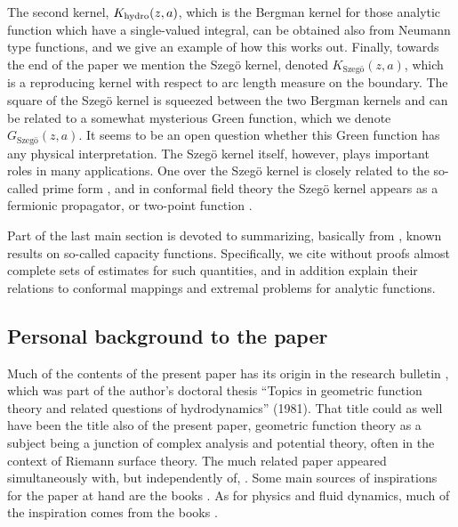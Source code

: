 \documentclass[reqno,12pt]{article}
\theoremstyle{plain}
\theoremstyle{definition}
\numberwithin{equation}{section}
\numberwithin{figure}{section}
\begin{document}
The second kernel, $K_{\rm hydro}(z,a)$, which is the Bergman kernel for those analytic function which have a single-valued
integral, can be obtained also from Neumann type functions, and we give an example of how this works out. Finally, 
towards the end of the paper we mention the Szeg\"o kernel, denoted $K_\text{Szeg\"o}(z,a)$, which is a reproducing kernel with respect to arc length 
measure on the boundary. The square of the Szeg\"o kernel is squeezed between the two Bergman kernels and can be
related to a somewhat mysterious Green function, which we denote $G_\text{Szeg\"o}(z,a)$. 
It  seems to be an open question whether this Green function has any physical interpretation.
The Szeg\"o kernel itself, however, plays important roles in many applications. One over the Szeg\"o kernel is closely
related to the so-called prime form \cite{Hejhal-1972, Fay-1973, Crowdy-2010}, and in conformal field theory the Szeg\"o kernel
appears as a fermionic propagator, or two-point function \cite{Raina-1989, Hoker-2024}. 
 
Part of the last main section is devoted to summarizing, basically  from \cite{Sario-Oikawa-1969},
known results on so-called capacity functions. Specifically, we cite without proofs almost complete sets
of  estimates for such quantities, and in addition explain their relations to conformal mappings and extremal problems for analytic functions.


\subsection{Personal background to the paper}

Much of the contents of the present paper has its origin in the research bulletin \cite{Gustafsson-1979}, which was part of the author's
doctoral thesis ``Topics in geometric function theory and related questions of hydrodynamics'' (1981). That title
could as well have been the title also of the present paper, 
geometric function theory as a subject being a junction of complex analysis and potential theory, often in the context of Riemann 
surface theory. The much related paper \cite{Richardson-1980} appeared simultaneously with, but independently of, \cite{Gustafsson-1979}.
Some main sources of inspirations for the paper at hand are the books
\cite{Schiffer-Spencer-1954, Sario-Oikawa-1969, Ahlfors-1973, Cohn-1980}. 
As for physics and fluid dynamics, much of the inspiration comes from the books \cite{Arnold-1978, Arnold-Khesin-1998}.
\end{document}
